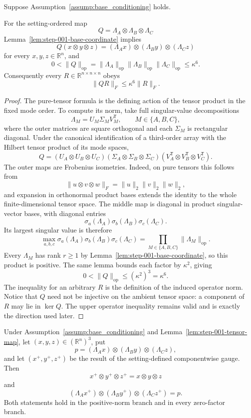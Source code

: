 \begin{lemma}
\label{lem:step-001-tensor-map}
Suppose Assumption~\ref{assump:base_conditioning} holds.

For the setting-ordered map
\[
Q=\Lambda_A\otimes\Lambda_B\otimes\Lambda_C
\]
Lemma~\ref{lem:step-001-base-coordinate} implies
\[
Q(x\otimes y\otimes z)
=(\Lambda_Ax)\otimes(\Lambda_By)\otimes(\Lambda_Cz)
\]
for every $x,y,z\in\mathbb R^n$, and
\[
0<\|Q\|_{\mathrm{op}}
=\|\Lambda_A\|_{\mathrm{op}}
 \|\Lambda_B\|_{\mathrm{op}}
 \|\Lambda_C\|_{\mathrm{op}}
\leq\kappa^6.
\]
Consequently every $R\in\mathbb R^{n\times n\times n}$ obeys
\[
\|QR\|_F\leq\kappa^6\|R\|_F.
\]
\end{lemma}

\begin{proof}
The pure-tensor formula is the defining action of the tensor product in the
fixed mode order.  To compute its norm, take full singular-value
decompositions
\[
\Lambda_M=U_M\Sigma_MV_M^{\mathsf T},
\qquad M\in\{A,B,C\},
\]
where the outer matrices are square orthogonal and each $\Sigma_M$ is
rectangular diagonal.  Under the canonical identification of a third-order
array with the Hilbert tensor product of its mode spaces,
\[
Q=(U_A\otimes U_B\otimes U_C)
  (\Sigma_A\otimes\Sigma_B\otimes\Sigma_C)
  (V_A^{\mathsf T}\otimes V_B^{\mathsf T}\otimes V_C^{\mathsf T}).
\]
The outer maps are Frobenius isometries.  Indeed, on pure tensors this follows
from
\[
\|u\otimes v\otimes w\|_F=\|u\|_2\|v\|_2\|w\|_2,
\]
and expansion in orthonormal product bases extends the identity to the whole
finite-dimensional tensor space.  The middle map is diagonal in product
singular-vector bases, with diagonal entries
\[
\sigma_a(\Lambda_A)\sigma_b(\Lambda_B)\sigma_c(\Lambda_C).
\]
Its largest singular value is therefore
\[
\max_{a,b,c}
\sigma_a(\Lambda_A)\sigma_b(\Lambda_B)\sigma_c(\Lambda_C)
=\prod_{M\in\{A,B,C\}}\|\Lambda_M\|_{\mathrm{op}}.
\]
Every $\Lambda_M$ has rank $r\geq1$ by
Lemma~\ref{lem:step-001-base-coordinate}, so this product is positive.
The same lemma bounds each factor by $\kappa^2$, giving
\[
0<\|Q\|_{\mathrm{op}}\leq(\kappa^2)^3=\kappa^6.
\]
The inequality for an arbitrary $R$ is the definition of the induced
operator norm.  Notice that $Q$ need not be injective on the ambient tensor
space: a component of $R$ may lie in $\ker Q$.  The upper operator inequality
remains valid and is exactly the direction used later.
\end{proof}

\begin{lemma}
\label{lem:step-001-gauge}
Under Assumption~\ref{assump:base_conditioning} and
Lemma~\ref{lem:step-001-tensor-map}, let $(x,y,z)\in(\mathbb R^n)^3$, put
\[
p=(\Lambda_Ax)\otimes(\Lambda_By)\otimes(\Lambda_Cz),
\]
and let $(x^+,y^+,z^+)$ be the result of the setting-defined componentwise
gauge.  Then
\[
x^+\otimes y^+\otimes z^+=x\otimes y\otimes z
\]
and
\[
(\Lambda_Ax^+)\otimes(\Lambda_By^+)\otimes(\Lambda_Cz^+)=p.
\]
Both statements hold in the positive-norm branch and in every zero-factor
branch.
\end{lemma}

